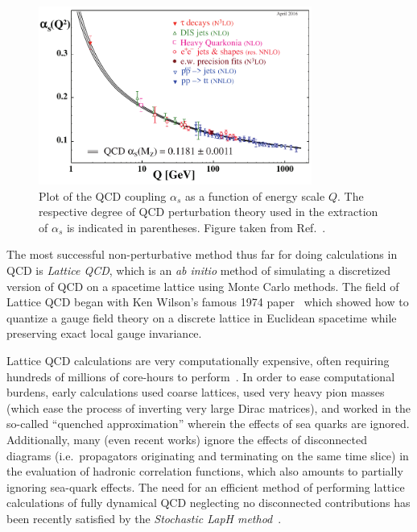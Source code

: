 \begin{figure}
    \centering
    \hspace*{-0.1in}\includegraphics[width=0.8\textwidth]{figures/alpha_s.pdf}
    \caption[Plot of the QCD coupling $\alpha_s$ as a function of energy scale $Q$.]{Plot of the QCD coupling $\alpha_s$ as a function of energy scale $Q$. The respective degree of QCD perturbation theory used in the extraction of $\alpha_s$ is indicated in parentheses. Figure taken from Ref.~\cite{PhysRevD.98.030001}.}\label{fig:alpha_s}
\end{figure}

The most successful non-perturbative method thus far for doing calculations in QCD is \emph{Lattice QCD}, which is an \emph{ab initio} method of simulating a discretized version of QCD on a spacetime lattice using Monte Carlo methods. The field of Lattice QCD began with Ken Wilson's famous 1974 paper~\cite{Wilson:1974sk} which showed how to quantize a gauge field theory on a discrete lattice in Euclidean spacetime while preserving exact local gauge invariance.

Lattice QCD calculations are very computationally expensive, often requiring hundreds of millions of core-hours to perform~\cite{Fallica2018}. In order to ease computational burdens, early calculations used coarse lattices, used very heavy pion masses (which ease the process of inverting very large Dirac matrices), and worked in the so-called ``quenched approximation'' wherein the effects of sea quarks are ignored. Additionally, many (even recent works) ignore the effects of disconnected diagrams (i.e.\ propagators originating and terminating on the same time slice) in the evaluation of hadronic correlation functions, which also amounts to partially ignoring sea-quark effects. The need for an efficient method of performing lattice calculations of fully dynamical QCD neglecting no disconnected contributions has been recently satisfied by the \emph{Stochastic LapH method}~\cite{Morningstar:2011ka}.

